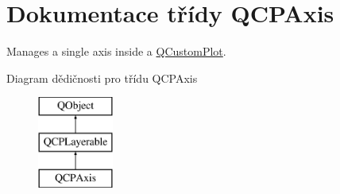 \hypertarget{classQCPAxis}{}\section{Dokumentace třídy Q\+C\+P\+Axis}
\label{classQCPAxis}


Manages a single axis inside a \hyperlink{classQCustomPlot}{Q\+Custom\+Plot}.  


Diagram dědičnosti pro třídu Q\+C\+P\+Axis\begin{figure}[H]
\begin{center}
\leavevmode
\includegraphics[height=3.000000cm]{classQCPAxis}
\end{center}
\end{figure}
